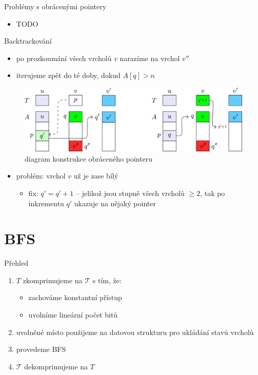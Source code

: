 \documentclass[czech]{beamer}
\begin{document}
	\begin{frame}{Problémy s obrácenými pointery}
		\begin{itemize}
			\item TODO
		\end{itemize}
	\end{frame}

	\begin{frame}{Backtrackování}
		\begin{itemize}
			\item po prozkoumání všech vrcholů $v$ narazíme na vrchol $v''$
			\item iterujeme zpět do té doby, dokud $A[q] > n$
		\end{itemize}

		\begin{figure}
			\centering
			\includegraphics{images/deg2-fix.png}
			\caption{diagram konstrukce obráceného pointeru}
		\end{figure}
		\begin{itemize}
			\item problém: vrchol $v$ už je zase bílý
			\begin{itemize}
				\item fix: $q' = q' + 1$ -- jelikož jsou stupně všech vrcholů $\ge 2$, tak po inkrementu $q'$ ukazuje na nějaký pointer
			\end{itemize}
		\end{itemize}
	\end{frame}

	\section{BFS}
	\begin{frame}{Přehled}
		\begin{enumerate}
			\item $T$ zkomprimujeme na $\mathcal{T}$ s tím, že:
			\begin{itemize}
				\item zachováme konstantní přístup
				\item uvolníme lineární počet bitů
			\end{itemize}
			\item uvolněné místo použijeme na datovou strukturu pro ukládání stavů vrcholů
			\item provedeme BFS
			\item $\mathcal{T}$ dekomprimujeme na $T$
		\end{enumerate}
	\end{frame}
\end{document}
